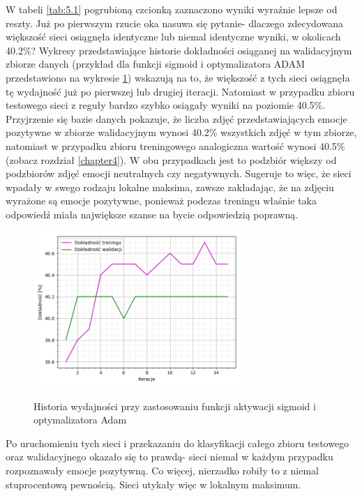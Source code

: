 W tabeli \ref{tab:5.1} pogrubioną czcionką zaznaczono wyniki wyraźnie lepsze od reszty. Już po pierwszym rzucie oka nasuwa się pytanie- dlaczego zdecydowana większość sieci osiągnęła identyczne lub niemal identyczne wyniki, w okolicach 40.2\%? Wykresy przedstawiające historie dokładności osiąganej na walidacyjnym zbiorze danych (przykład dla funkcji sigmoid i optymalizatora ADAM przedstawiono na wykresie \ref{pic:5.1}) wskazują na to, że większość z tych sieci osiągnęła tę wydajność już po pierwszej lub drugiej iteracji. Natomiast w przypadku zbioru testowego sieci z reguły bardzo szybko osiągały wyniki na poziomie 40.5\%. Przyjrzenie się bazie danych pokazuje, że liczba zdjęć przedstawiających emocje pozytywne w zbiorze walidacyjnym wynosi 40.2\% wszystkich zdjęć w tym zbiorze, natomiast w przypadku zbioru treningowego analogiczna wartość wynosi 40.5\% (zobacz rozdział \ref{chapter4}). W obu przypadkach jest to podzbiór większy od podzbiorów zdjęć emocji neutralnych czy negatywnych. Sugeruje to więc, że sieci wpadały w swego rodzaju lokalne maksima, zawsze zakładając, że na zdjęciu wyrażone są emocje pozytywne, ponieważ podczas treningu właśnie taka odpowiedź miała największe szanse na bycie odpowiedzią poprawną.

\begin{figure}[H]
    \caption{Historia wydajności przy zastosowaniu funkcji aktywacji sigmoid i optymalizatora Adam}
    \centering
    \includegraphics[width=0.7\textwidth]{wykres1.png}
    \label{pic:5.1}
\end{figure}

Po uruchomieniu tych sieci i przekazaniu do klasyfikacji całego zbioru testowego oraz walidacyjnego okazało się to prawdą- sieci niemal w każdym przypadku rozpoznawały emocje pozytywną. Co więcej, nierzadko robiły to z niemal stuprocentową pewnością. Sieci utykały więc w lokalnym maksimum.

